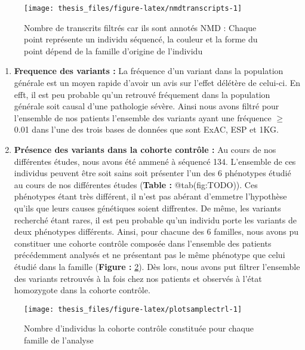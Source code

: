 \documentclass[12pt,twoside]{reedthesis}
\providecommand{\tightlist}{%
  \setlength{\itemsep}{0pt}\setlength{\parskip}{0pt}}
\theoremstyle{definition}
\theoremstyle{definition}
\theoremstyle{remark}
\begin{document}
  \begin{figure}
  
  {\centering \texttt{[image: thesis\_files/figure-latex/nmdtranscripts-1]} 
  
  }
  
  \caption[Nombre de transcrits filtrés car ils sont annotés NMD]{Nombre de transcrits filtrés car ils sont annotés NMD : Chaque point représente un individu séquencé, la couleur et la forme du point dépend de la famille d'origine de l'individu}\label{fig:nmdtranscripts}
  \end{figure}
  
  \begin{enumerate}
  \def\labelenumi{\arabic{enumi}.}
  \setcounter{enumi}{4}
  \tightlist
  \item
    \textbf{Frequence des variants :} La fréquence d'un variant dans la
    population générale est un moyen rapide d'avoir un avis sur l'effet
    délétère de celui-ci. En efft, il est peu probable qu'un retrouvé
    fréquement dans la population générale soit causal d'une pathologie
    sévère. Ainsi nous avons filtré pour l'ensemble de nos patients
    l'ensemble des variants ayant une fréquence \(\ge\) 0.01 dans l'une
    des trois bases de données que sont ExAC, ESP et 1KG.\\
  \item
    \textbf{Présence des variants dans la cohorte contrôle :} Au cours de
    nos différentes études, nous avons été ammené à séquencé 134.
    L'ensemble de ces individus peuvent être soit sains soit présenter
    l'un des 6 phénotypes étudié au cours de nos différentes études
    (\textbf{Table : }@tab(fig:TODO)). Ces phénotypes étant très
    différent, il n'est pas abérant d'emmetre l'hypothèse qu'ils que leurs
    causes génétiques soient diffrentes. De même, les variants recherché
    étant rares, il est peu probable qu'un individu porte les variants de
    deux phénotypes différents. Ainsi, pour chacune des 6 familles, nous
    avons pu constituer une cohorte contrôle composée dans l'ensemble des
    patients précédemment analysés et ne présentant pas le même phénotype
    que celui étudié dans la famille (\textbf{Figure :
    }\ref{fig:plotsamplectrl}). Dès lors, nous avons put filtrer
    l'ensemble des variants retrouvés à la fois chez nos patients et
    observés à l'état homozygote dans la cohorte contrôle.
  \end{enumerate}
  
  \begin{figure}
  
  {\centering \texttt{[image: thesis\_files/figure-latex/plotsamplectrl-1]} 
  
  }
  
  \caption[Nombre d'individus la cohorte contrôle constituée pour chaque famille de l'analyse]{Nombre d'individus la cohorte contrôle constituée pour chaque famille de l'analyse}\label{fig:plotsamplectrl}
  \end{figure}
  
\end{document}
